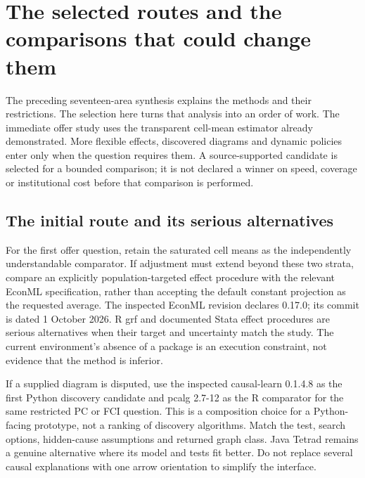 \section{The selected routes and the comparisons that could change them}
\label{rewrite:software-selection}

The preceding seventeen-area synthesis explains the methods and their
restrictions. The selection here turns that analysis into an order of work.
The immediate offer study uses the transparent cell-mean estimator already
demonstrated. More flexible effects, discovered diagrams and dynamic policies
enter only when the question requires them. A source-supported candidate is
selected for a bounded comparison; it is not declared a winner on speed,
coverage or institutional cost before that comparison is performed.

\subsection{The initial route and its serious alternatives}
For the first offer question, retain the saturated cell means as the
independently understandable comparator. If adjustment must extend beyond
these two strata, compare an explicitly population-targeted effect procedure
with the relevant EconML specification, rather than accepting the default
constant projection as the requested average. The inspected EconML revision
declares 0.17.0; its commit is dated 1 October 2026. R grf and documented
Stata effect procedures are serious alternatives when their target and
uncertainty match the study. The current environment's absence of a package
is an execution constraint, not evidence that the method is inferior.
\citep{exec19_econml_source,exec13_grf_rpath,exec13_ch_stata}

If a supplied diagram is disputed, use the inspected causal-learn 0.1.4.8
as the first Python discovery candidate and pcalg 2.7-12 as the R comparator
for the same restricted PC or FCI question. This is a composition choice
for a Python-facing prototype, not a ranking of discovery algorithms.
Match the test, search options, hidden-cause assumptions and returned graph
class. Java Tetrad remains a genuine alternative where its model and tests
fit better. Do not replace several causal explanations with one arrow
orientation to simplify the interface.
\citep{v12_sw_causallearn,exec13_pcalg_reuse_primary,exec13_java_tetrad}

